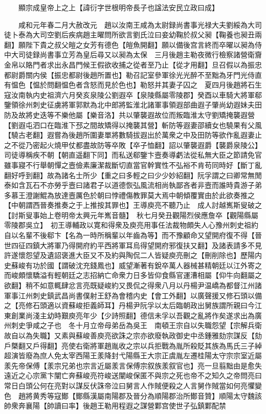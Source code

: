 　　顯宗成皇帝上之上【諱衍字世根明帝長子也諡法安民立政曰成】

　　咸和元年春二月大赦改元　趙以汝南王咸為太尉録尚書事光禄大夫劉綏為大司徒卜泰為大司空劉后疾病趙主曜問所欲言劉氏泣曰妾幼鞠於叔父昶【鞠養也昶丑兩翻】願陛下貴之叔父皚之女芳有德色【皚魚開翻】願以備後宫言終而卒曜以昶為侍中大司徒録尚書事立芳為皇后尋又以昶為太保　三月後趙主勒夜微行檢察諸營衛齎金帛以賂門者求出永昌門候王假欲收捕之從者至乃止【從才用翻】旦召假以為振忠都尉爵關内侯【振忠都尉後趙所置也】勒召記室參軍徐光光醉不至黜為牙門光侍直有愠色【愠於問翻愠色者含怒而見於色也】勒怒并其妻子囚之　夏四月後趙將石生寇汝南執内史祖濟六月癸亥泉陵公劉遐卒【泉陵縣屬零陵郡】癸酉以車騎大將軍郗鑒領徐州刺史征虜將軍郭默為北中郎將監淮北諸軍事領遐部曲遐子肇尚幼遐妹夫田防及故將史迭等不樂他屬【樂音洛】共以肇襲遐故位而叛臨淮太守劉矯掩襲遐營【劉遐屯泗口在臨淮下邳之間故矯得以掩襲其營】斬防等遐妻邵續女也驍果有父風【驍古老翻】遐嘗為後趙所圍妻單將數騎拔遐出於萬衆之中及田防等欲作亂遐妻止之不從乃密起火燒甲仗都盡故防等卒敗【卒子恤翻】詔以肇襲遐爵【襲爵泉陵公】司徒導稱疾不朝【朝直遥翻下同】而私送郗鑒卞壼奏導虧法從私無大臣之節請免官雖事寢不行舉朝憚之壼儉素廉潔裁斷切直當官幹實性不弘裕不肯苟同時好【斷丁亂翻好呼到翻】故為諸名士所少【重之曰多輕之曰少少妙紹翻】阮孚謂之曰卿常無閒泰如含瓦石不亦勞乎壼曰諸君子以道德恢弘風流相尚執鄙吝者非壼而誰時貴游子弟多慕王澄謝鯤為放達壼厲色於朝曰悖禮傷教罪莫大焉中朝傾覆實由於此欲奏推之【中朝謂西晉奏推奏之于上推按其罪也】王導庾亮不聽乃止　成人討越嶲斯叟破之【討斯叟事始上卷明帝太興元年嶲音髓】　秋七月癸丑觀陽烈侯應詹卒【觀陽縣屬零陵郡吳立】　初王導輔政以寛和得衆及庾亮用事任法裁物頗失人心豫州刺史祖約自以名輩不後郗卞【名為一時所稱輩以年齒為等】而不豫顧命又望開府復不得【晉世四征四鎮大將軍乃得開府約平西將軍耳烏得望開府邪復扶又翻】及諸表請多不見許遂懷怨望及遺詔褒進大臣又不及約與陶侃二人皆疑庾亮刪之【刪削除也】歷陽内史蘇峻有功於國【謂破沈充錢鳳也】威望漸著有銳卒萬人器械甚精朝廷以江外寄之而峻頗懷驕溢有輕朝廷之志招納亡命衆力日多皆仰食縣官運漕相屬【仰牛向翻屬之欲翻】稍不如意輒肆忿言亮既疑峻約又畏侃之得衆八月以丹楊尹温嶠為都督江州諸軍事江州刺史鎮武昌尚書僕射王舒為會稽内史【會工外翻】以廣聲援又修石頭以備之【亮修石頭適以資蘇峻拒義師耳】丹楊尹阮孚以太后臨朝政出舅族謂所親曰今江東創業尚淺主幼時艱庾亮年少【少詩照翻】德信未孚以吾觀之亂將作矣遂求出為廣州刺史爭咸之子也　冬十月立帝母弟岳為吳王　南頓王宗自以失職怨望【宗解兵衛故自以為失職】又素與蘇峻善庾亮欲誅之宗亦欲廢執政御史中丞鍾雅劾宗謀反【劾戶槩翻又戶得翻】亮使右衛將軍趙胤收之宗以兵拒戰為胤所殺貶其族為馬氏三子綽超演皆廢為庶人免太宰西陽王羕降封弋陽縣王大宗正虞胤左遷桂陽太守宗宗室近屬羕先帝保傅【羕宗兄弟也宗言近屬羕言保傅宗叙族羕叙官也】亮一旦翦黜由是愈失遠近之心宗黨卞闡亡奔蘇峻亮符峻送闡峻保匿不與宗之死也帝不之知久之帝問亮曰常日白頭公何在亮對以謀反伏誅帝泣曰舅言人作賊便殺之人言舅作賊當如何亮懼變色　趙將黄秀等寇鄼【鄼縣漢屬南陽郡及晉分為順陽郡治所鄼音贊】順陽太守魏該帥衆奔襄陽【帥讀曰率】後趙王勒用程遐之謀營鄴宫使世子弘鎮鄴配禁

